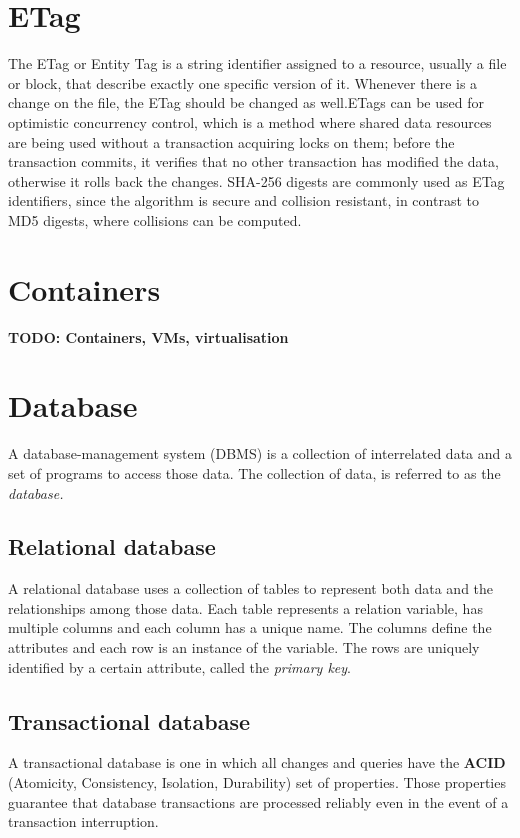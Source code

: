 \section{ETag}
  The ETag or Entity Tag is a string identifier assigned to a resource, usually a file or block, that describe exactly one specific version of it. Whenever there is a change on the file, the ETag should be changed as well.ETags can be used for optimistic concurrency control\cite{concurrency-control}, which is a method where shared data resources are being used without a transaction acquiring locks on them; before the transaction commits, it verifies that no other transaction has modified the data, otherwise it rolls back the changes. SHA-256 digests are commonly used as ETag identifiers, since the algorithm is secure and collision resistant, in contrast to MD5 digests, where collisions can be computed.

\section{Containers}
  {\color{red}\textbf{TODO: Containers, VMs, virtualisation}}

\section{Database}
  A database-management system (DBMS) \cite{dbms-sil} is a collection of interrelated data and a set of programs to access those data. The collection of data, is referred to as the \emph{database.}

  \subsection{Relational database}
    A relational database uses a collection of tables to represent both data and the relationships among those data. Each table represents a relation variable, has multiple columns and each column has a unique name. The columns define the attributes and each row is an instance of the variable. The rows are uniquely identified by a certain attribute, called the \emph{primary key}.

  \subsection{Transactional database}
    A transactional database is one in which all changes and queries have the \textbf{ACID} \cite{acid} (Atomicity, Consistency, Isolation, Durability) set of properties. Those properties guarantee that database transactions are processed reliably even in the event of a transaction interruption.

